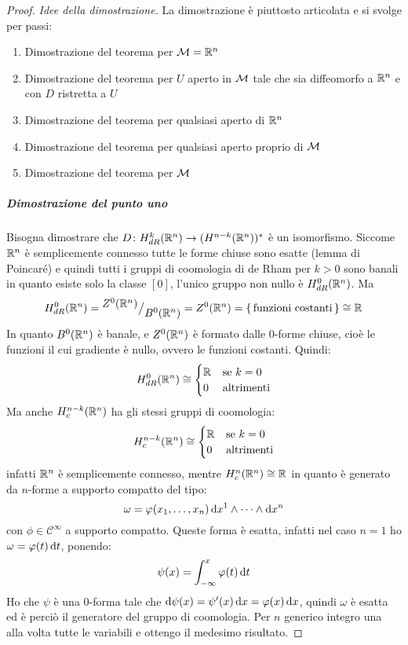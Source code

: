 \begin{proof}\emph{Idee della dimostrazione.}
  La dimostrazione è piuttosto articolata e si svolge per passi:
  \begin{enumerate}
  \item Dimostrazione del teorema per $ \mathcal{M} = \mathbb{R}^{n} $
  \item Dimostrazione del teorema per $ U $ aperto in $ \mathcal{M} $ tale che sia diffeomorfo a $ \mathbb{R}^{n} $
    e con $ D $ ristretta a $ U $
  \item Dimostrazione del teorema per qualsiasi aperto di $ \mathbb{R}^{n} $
  \item Dimostrazione del teorema per qualsiasi aperto proprio di $ \mathcal{M} $
  \item Dimostrazione del teorema per $ \mathcal{M} $
  \end{enumerate}

  \subparagraph{Dimostrazione del punto uno} Bisogna dimostrare che
  $ D \colon H^k_{dR}(\mathbb{R}^{n}) \to (H^{n-k}(\mathbb{R}^{n}))^* $ è un isomorfismo. Siccome
  $ \mathbb{R}^{n} $ è semplicemente connesso tutte le forme chiuse sono esatte (lemma
  di Poincaré) e quindi tutti i gruppi di coomologia di de Rham per $ k > 0 $
  sono banali in quanto esiste solo la classe $ [0] $, l'unico gruppo non nullo
  è $ H^0_{dR}(\mathbb{R}^{n}) $. Ma
  \[
    H^0_{dR}(\mathbb{R}^{n}) = {^{\textstyle Z^0(\mathbb{R}^{n})}\big/_{\textstyle B^0(\mathbb{R}^{n})}} = Z^0(\mathbb{R}^{n}) =
    {\set{\text{funzioni costanti}}} \cong \mathbb{R}^{}
  \]
  In quanto $ B^0(\mathbb{R}^{n}) $ è banale, e $ Z^0(\mathbb{R}^{n}) $ è formato dalle
  $ 0 $-forme chiuse, cioè le funzioni il cui gradiente è nullo, ovvero le
  funzioni costanti. Quindi:
  \[
    H^0_{dR}(\mathbb{R}^{n}) \cong
    \begin{cases}
      \mathbb{R}^{} & \text{se } k = 0 \\
      0 & \text{altrimenti}
    \end{cases}
  \]
  Ma anche $ H^{n-k}_c(\mathbb{R}^{n}) $ ha gli stessi gruppi di coomologia:
  \[
    H^{n-k}_c(\mathbb{R}^{n}) \cong
    \begin{cases}
      \mathbb{R}^{} & \text{se } k = 0 \\
      0 & \text{altrimenti}
    \end{cases}
  \]
  infatti $ \mathbb{R}^{n} $ è semplicemente connesso, mentre
  $ H^{n}_c(\mathbb{R}^{n}) \cong \mathbb{R}^{} $ in quanto è generato da $ n $-forme a supporto compatto del tipo:
  \[
    \omega = \varphi(x_1, \dots, x_n) \operatorname{d}\!{x}^1 \wedge \dots \wedge \operatorname{d}\!{x}^n
  \]
  con $ \phi \in \mathcal{C}^\infty $ a supporto compatto. Queste forma è esatta, infatti
  nel caso $ n = 1 $ ho $ \omega = \varphi(t) \operatorname{d}\!{t} $, ponendo:
  \[
    \psi(x) = \int_{-\infty}^x \varphi(t) \operatorname{d}\!{t}
  \]
  Ho che $ \psi $ è una $ 0 $-forma tale che
  $ \operatorname{d}\!{\psi} (x) = \psi'(x) \operatorname{d}\!{x} = \varphi(x) \operatorname{d}\!{x} $, quindi $ \omega $ è esatta ed è perciò il
  generatore del gruppo di coomologia. Per $ n $ generico integro una alla volta
  tutte le variabili e ottengo il medesimo risultato.


\end{proof}
